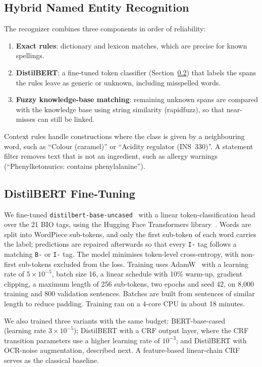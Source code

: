 \documentclass[conference]{IEEEtran}
\begin{document}
\subsection{Hybrid Named Entity Recognition}
The recognizer combines three components in order of reliability:
\begin{enumerate}
\item \textbf{Exact rules}: dictionary and lexicon matches, which are precise for known spellings.
\item \textbf{DistilBERT}: a fine-tuned token classifier (Section~\ref{sec:distilbert}) that labels the spans the rules leave as generic or unknown, including misspelled words.
\item \textbf{Fuzzy knowledge-base matching}: remaining unknown spans are compared with the knowledge base using string similarity (rapidfuzz), so that near-misses can still be linked.
\end{enumerate}
Context rules handle constructions where the class is given by a neighbouring word, such as ``Colour (caramel)'' or ``Acidity regulator (INS~330)''. A statement filter removes text that is not an ingredient, such as allergy warnings (``Phenylketonurics: contains phenylalanine'').

\subsection{DistilBERT Fine-Tuning}
\label{sec:distilbert}
We fine-tuned \texttt{distilbert-base-uncased}~\cite{distilbert} with a linear token-classification head over the 21 BIO tags, using the Hugging Face Transformers library~\cite{wolf2020transformers}. Words are split into WordPiece sub-tokens, and only the first sub-token of each word carries the label; predictions are repaired afterwards so that every \texttt{I-} tag follows a matching \texttt{B-} or \texttt{I-} tag. The model minimises token-level cross-entropy, with non-first sub-tokens excluded from the loss. Training uses AdamW~\cite{adamw} with a learning rate of $5\times10^{-5}$, batch size 16, a linear schedule with 10\% warm-up, gradient clipping, a maximum length of 256 sub-tokens, two epochs and seed 42, on 8,000 training and 800 validation sentences. Batches are built from sentences of similar length to reduce padding. Training ran on a 4-core CPU in about 18 minutes.

We also trained three variants with the same budget: BERT-base-cased~\cite{bert} (learning rate $3\times10^{-5}$); DistilBERT with a CRF output layer, where the CRF transition parameters use a higher learning rate of $10^{-3}$; and DistilBERT with OCR-noise augmentation, described next. A feature-based linear-chain CRF~\cite{crf} serves as the classical baseline.
\end{document}
